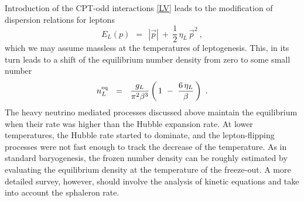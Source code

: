 \documentclass[12pt]{revtex4}
\newcommand{\eq}{{\rm eq}}
\begin{document}
Introduction of the CPT-odd interactions \eqref{LV} leads to the modification of 
dispersion relations for leptons
\[
	E_L(p) ~~=~~ |\vec{p}| ~+~ \frac 12\, \eta_L\, \vec{p}^2~,
\]
which we may assume massless at the temperatures of leptogenesis.
This, in its turn leads to a shift of the equilibrium number density
from zero to some small number
\[
        n_L^\eq ~~=~~ \frac{g_L}{\pi^2 \beta^3}
			\left (\, 1 ~-~ \frac{6\,\eta_L}{\beta} \,\right)~.
\]
The heavy neutrino mediated processes discussed above maintain the equilibrium
when their rate was higher than the Hubble expansion rate.
At lower temperatures, the Hubble rate started to dominate, and the
lepton-flipping processes were not fast enough to track the decrease
of 
the temperature. 
As in standard baryogenesis, the frozen number density can be roughly
estimated by evaluating the equilibrium density at the temperature
of the freeze-out.
A more detailed survey, however, should involve the analysis of kinetic equations and
take into account the sphaleron rate.
\end{document}
